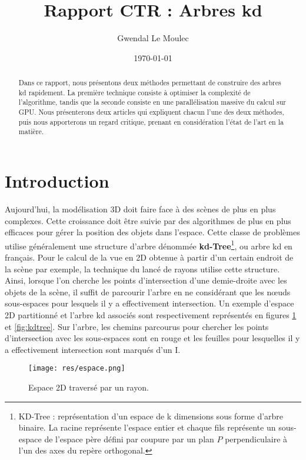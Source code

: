 \documentclass[a4paper]{article}
\title{Rapport CTR : Arbres kd}
\author{Gwendal Le Moulec}
\date{\today}
\begin{document}
\maketitle

\begin{abstract}
Dans ce rapport, nous présentons deux méthodes permettant de construire des arbres kd rapidement. La première technique consiste à optimiser la complexité de l'algorithme, tandis que la seconde consiste en une parallélisation massive du calcul sur GPU. Nous présenterons deux articles qui expliquent chacun l'une des deux méthodes, puis nous apporterons un regard critique, prenant en considération l'état de l'art en la matière.
\end{abstract}

\section{Introduction}

Aujourd'hui, la modélisation 3D doit faire face à des scènes de plus en plus complexes. Cette croissance doit être suivie par des algorithmes de plus en plus efficaces pour gérer la position des objets dans l'espace. Cette classe de problèmes utilise généralement une structure d'arbre dénommée \textbf{kd-Tree}\footnote{KD-Tree : représentation d'un espace de k dimensions sous forme d'arbre binaire. La racine représente l'espace entier et chaque fils représente un sous-espace de l'espace père défini par coupure par un plan $P$ perpendiculaire à l'un des axes du repère orthogonal.}, ou arbre kd en français. Pour le calcul de la vue en 2D obtenue à partir d'un certain endroit de la scène par exemple, la technique du lancé de rayons utilise cette structure. Ainsi, lorsque l'on cherche les points d'intersection d'une demie-droite avec les objets de la scène, il suffit de parcourir l'arbre en ne considérant que les nœuds sous-espaces pour lesquels il y a effectivement intersection. Un exemple d'espace 2D partitionné et l'arbre kd associés sont respectivement représentés en figures \ref{fig:espace} et \ref{fig:kdtree}. Sur l'arbre, les chemins parcourus pour chercher les points d'intersection avec les sous-espaces sont en rouge et les feuilles pour lesquelles il y a effectivement intersection sont marqués d'un I.

\begin{figure}[!h]
\centering
\texttt{[image: res/espace.png]}
\caption{\label{fig:espace}Espace 2D traversé par un rayon.}
\end{figure}
\end{document}
